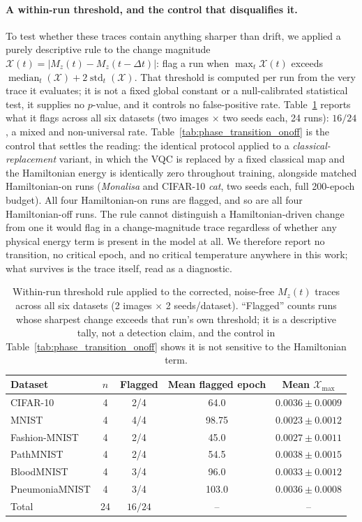 \documentclass[11pt]{article}
\begin{document}
\paragraph{A within-run threshold, and the control that disqualifies it.} To test whether these traces contain anything sharper than drift, we applied a purely descriptive rule to the change magnitude $\mathcal{X}(t)=|M_z(t)-M_z(t-\Delta t)|$: flag a run when $\max_t \mathcal{X}(t)$ exceeds $\operatorname{median}_t(\mathcal{X}) + 2\operatorname{std}_t(\mathcal{X})$. That threshold is computed per run from the very trace it evaluates; it is not a fixed global constant or a null-calibrated statistical test, it supplies no $p$-value, and it controls no false-positive rate. Table~\ref{tab:phase_transition_corrected} reports what it flags across all six datasets (two images $\times$ two seeds each, 24 runs): $16/24$, a mixed and non-universal rate. Table~\ref{tab:phase_transition_onoff} is the control that settles the reading: the identical protocol applied to a \emph{classical-replacement} variant, in which the VQC is replaced by a fixed classical map and the Hamiltonian energy is identically zero throughout training, alongside matched Hamiltonian-on runs (\textit{Monalisa} and CIFAR-10 \textit{cat}, two seeds each, full 200-epoch budget). All four Hamiltonian-on runs are flagged, and so are all four Hamiltonian-off runs. The rule cannot distinguish a Hamiltonian-driven change from one it would flag in a change-magnitude trace regardless of whether any physical energy term is present in the model at all. We therefore report no transition, no critical epoch, and no critical temperature anywhere in this work; what survives is the trace itself, read as a diagnostic.

\begin{table}[H]
\centering
\caption{Within-run threshold rule applied to the corrected, noise-free $M_z(t)$ traces across all six datasets (2 images $\times$ 2 seeds/dataset). ``Flagged'' counts runs whose sharpest change exceeds that run's own threshold; it is a descriptive tally, not a detection claim, and the control in Table~\ref{tab:phase_transition_onoff} shows it is not sensitive to the Hamiltonian term.}
\label{tab:phase_transition_corrected}
\scriptsize
\begin{tabular}{lcccc}
\toprule
Dataset & $n$ & Flagged & Mean flagged epoch & Mean $\mathcal{X}_{\max}$ \\
\midrule
CIFAR-10 & 4 & 2/4 & 64.0 & $0.0036\pm0.0009$ \\
MNIST & 4 & 4/4 & 98.75 & $0.0023\pm0.0012$ \\
Fashion-MNIST & 4 & 2/4 & 45.0 & $0.0027\pm0.0011$ \\
PathMNIST & 4 & 2/4 & 54.5 & $0.0038\pm0.0015$ \\
BloodMNIST & 4 & 3/4 & 96.0 & $0.0033\pm0.0012$ \\
PneumoniaMNIST & 4 & 3/4 & 103.0 & $0.0036\pm0.0008$ \\
\midrule
Total & 24 & $16/24$ & -- & -- \\
\bottomrule
\end{tabular}
\end{table}
\end{document}
